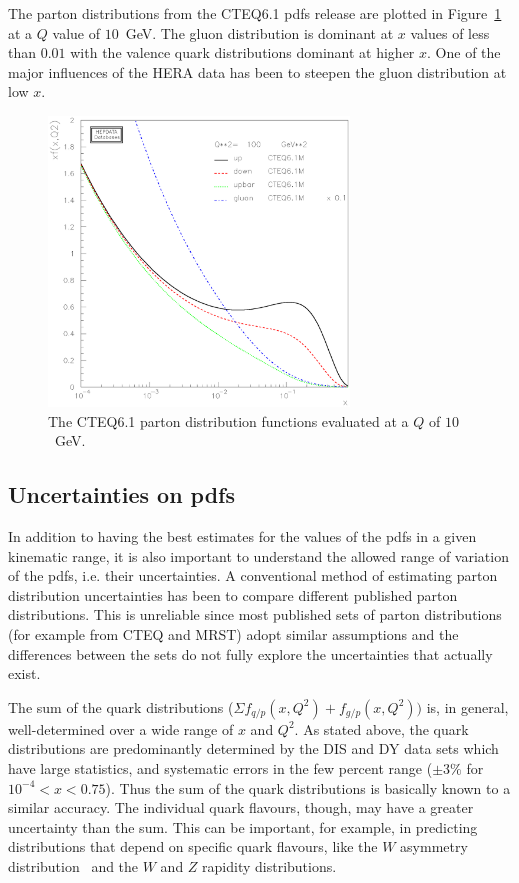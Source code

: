 \documentclass[12pt]{iopart}
\begin{document}
The parton distributions from the CTEQ6.1 pdfs release are  plotted in Figure~\ref{fig:Allpdf} at a $Q$ value of $10$~GeV. The
gluon  distribution is dominant at $x$ values of less than $0.01$ with the valence quark distributions dominant at higher $x$. One
of the major influences of the HERA data has been to steepen the gluon distribution at low $x$. 
%
\begin{figure}[t]
\begin{center}
\includegraphics[width=8cm]{plotpaw_allpdf.ps}
\end{center}
\caption{
The CTEQ6.1 parton distribution functions evaluated at a $Q$ of $10$~GeV. 
} 
\label{fig:Allpdf}
\end{figure}
%


\subsection{Uncertainties on pdfs}
\label{sec:uncertainties}

In addition to having the best estimates for the values of the pdfs in a given kinematic range, it is also important to
understand the allowed range of variation of  the pdfs, i.e. their uncertainties. A conventional method of estimating parton
distribution uncertainties has been to compare different published parton  distributions.  This is unreliable since most
published sets of parton distributions (for example from CTEQ and MRST) adopt  similar assumptions and the differences between
the sets do not fully explore the uncertainties that actually exist.  

The sum of the quark distributions 
($\Sigma f_{q/p}(x,Q^2)+ f_{g/p}(x,Q^2))$ 
is, in general,
well-determined over a wide range of $x$ and $Q^2$.  As stated above, the quark distributions are predominantly determined by the
DIS and DY data sets which have large statistics, and systematic errors in the few percent range ($\pm3\%$ for 
$10^{-4}<x<0.75$).  Thus the sum of the quark distributions is basically known to a similar accuracy. The individual  quark
flavours, though,  may have a greater uncertainty than the sum. This can be important, for example, in predicting distributions
that depend on specific quark flavours, like the $W$ asymmetry distribution~\cite{ Abe:1998rv} and the $W$ and $Z$ rapidity
distributions.
\end{document}

